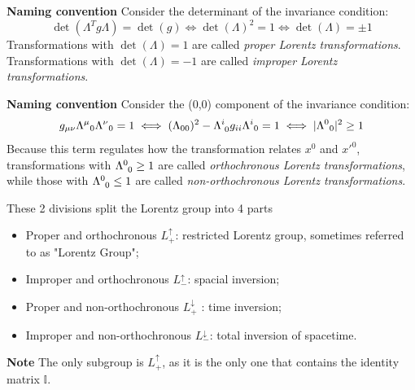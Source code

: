 \textbf{Naming convention} Consider the determinant of the invariance condition:
$$\det(\Lambda^Tg\Lambda)=\det(g)\iff\det(\Lambda)^2=1\iff\det(\Lambda)=\pm1$$
Transformations with $\det(\Lambda) = 1$ are called \textit{proper Lorentz transformations}.\\
Transformations with $\det(\Lambda)=-1$ are called \textit{improper Lorentz transformations}.

\textbf{Naming convention} Consider the (0,0) component of the invariance condition:
$$g_{\mu\nu}{\Lambda^\mu}_0{\Lambda^\nu}_0 = 1 \iff (\Lambda_{00})^2 - \Lambda\indices{^i_0}
g_{ii}{\Lambda^i}_0=1\iff |{\Lambda^0}_{0}|^2\geq1$$
Because this term regulates how the transformation relates $x^0$ and $x'^0$,
transformations with $\Lambda\indices{^0_0}\geq1$ are called
\textit{orthochronous Lorentz transformations}, while those with $\Lambda\indices{^0_0}\leq1$ are
called \textit{non-orthochronous Lorentz transformations}.

These 2 divisions split the Lorentz group into 4 parts
\begin{itemize}
    \item Proper and orthochronous $L^{\uparrow}_{+}$: restricted Lorentz group, sometimes referred to
	as "Lorentz Group";
    \item Improper and orthochronous $L^{\uparrow}_-$: spacial inversion;
    \item Proper and non-orthochronous $L^{\downarrow}_+$ : time inversion;
    \item Improper and non-orthochronous $L^{\downarrow}_-$: total inversion of spacetime.
\end{itemize}
\textbf{Note} The only subgroup is $L^\uparrow_+$, as it is the only one that contains the identity
matrix $\mathbb{I}$.

